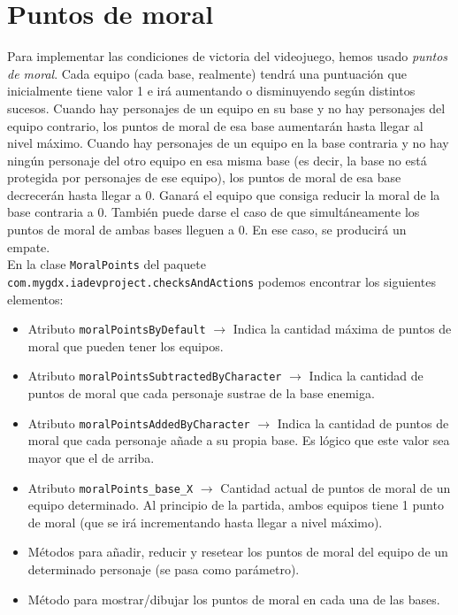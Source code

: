 \medskip
\section{Puntos de moral}

Para implementar las condiciones de victoria del videojuego, hemos usado \textit{puntos de moral}. Cada equipo (cada base, realmente) tendrá una puntuación que inicialmente tiene valor 1 e irá aumentando o disminuyendo según distintos sucesos. Cuando hay personajes de un equipo en su base y no hay personajes del equipo contrario, los puntos de moral de esa base aumentarán hasta llegar al nivel máximo. Cuando hay personajes de un equipo en la base contraria y no hay ningún personaje del otro equipo en esa misma base (es decir, la base no está protegida por personajes de ese equipo), los puntos de moral de esa base decrecerán hasta llegar a 0. Ganará el equipo que consiga reducir la moral de la base contraria a 0. También puede darse el caso de que simultáneamente los puntos de moral de ambas bases lleguen a 0. En ese caso, se producirá un empate. \\

En la clase \texttt{MoralPoints} del paquete \texttt{com.mygdx.iadevproject.checksAndActions} podemos encontrar los siguientes elementos:
\begin{itemize}
	\item Atributo \texttt{moralPointsByDefault} $\rightarrow$ Indica la cantidad máxima de puntos de moral que pueden tener los equipos.
	\item Atributo \texttt{moralPointsSubtractedByCharacter} $\rightarrow$ Indica la cantidad de puntos de moral que cada personaje sustrae de la base enemiga.
	\item Atributo \texttt{moralPointsAddedByCharacter} $\rightarrow$ Indica la cantidad de puntos de moral que cada personaje añade a su propia base. Es lógico que este valor sea mayor que el de arriba.
	\item Atributo \texttt{moralPoints\_base\_X} $\rightarrow$ Cantidad actual de puntos de moral de un equipo determinado. Al principio de la partida, ambos equipos tiene 1 punto de moral (que se irá incrementando hasta llegar a nivel máximo).
	\item Métodos para añadir, reducir y resetear los puntos de moral del equipo de un determinado personaje (se pasa como parámetro).
	\item Método para mostrar/dibujar los puntos de moral en cada una de las bases.
\end{itemize}

